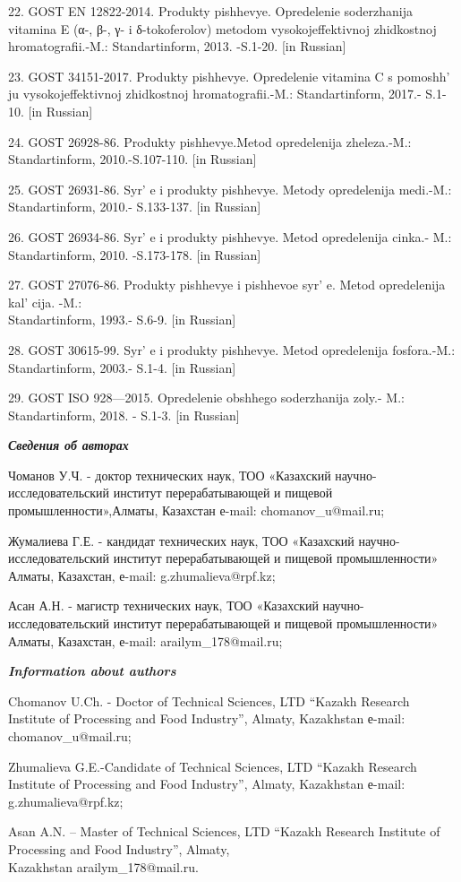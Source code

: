 \begin{references}
22. GOST EN 12822-2014. Produkty pishhevye. Opredelenie soderzhanija
vitamina E (α-, β-, γ- i δ-tokoferolov) metodom vysokojeffektivnoj
zhidkostnoj hromatografii.-M.: Standartinform, 2013. -S.1-20. {[}in
Russian{]}

23. GOST 34151-2017. Produkty pishhevye. Opredelenie vitamina C s
pomoshh' ju vysokojeffektivnoj zhidkostnoj
hromatografii.-M.: Standartinform, 2017.- S.1-10. {[}in Russian{]}

24. GOST 26928-86. Produkty pishhevye.Metod opredelenija zheleza.-M.:
Standartinform, 2010.-S.107-110. {[}in Russian{]}

25. GOST 26931-86. Syr' e i produkty pishhevye. Metody
opredelenija medi.-M.: Standartinform, 2010.- S.133-137. {[}in
Russian{]}

26. GOST 26934-86. Syr' e i produkty pishhevye. Metod
opredelenija cinka.- M.: Standartinform, 2010. -S.173-178. {[}in
Russian{]}

27. GOST 27076-86. Produkty pishhevye i pishhevoe syr' e.
Metod opredelenija kal' cija. -M.: \\Standartinform, 1993.-
S.6-9. {[}in Russian{]}

28. GOST 30615-99. Syr' e i produkty pishhevye. Metod
opredelenija fosfora.-M.: Standartinform, 2003.- S.1-4. {[}in
Russian{]}

29. GOST ISO 928---2015. Opredelenie obshhego soderzhanija zoly.- M.:
Standartinform, 2018. - S.1-3. {[}in Russian{]}
\end{references}

\begin{authorinfo}
\emph{{\bfseries Сведения об авторах}}

Чоманов У.Ч. - доктор технических наук, ТОО «Казахский
научно-исследовательский институт перерабатывающей и пищевой
промышленности»,Алматы, Казахстан е-mail:
chomanov\_u@mail.ru;

Жумалиева Г.Е. - кандидат технических наук, ТОО «Казахский
научно-исследовательский институт перерабатывающей и пищевой
промышленности» Алматы, Казахстан, е-mail:
g.zhumalieva@rpf.kz;

Асан А.Н. - магистр технических наук, ТОО «Казахский
научно-исследовательский институт перерабатывающей и пищевой
промышленности» Алматы, Казахстан, е-mail:
arailym\_178@mail.ru;

\emph{{\bfseries Information about authors}}

Chomanov U.Ch. - Doctor of Technical Sciences, LTD ``Kazakh Research
Institute of Processing and Food Industry'', Almaty, Kazakhstan е-mail:
chomanov\_u@mail.ru;

Zhumalieva G.E.-Candidate of Technical Sciences, LTD ``Kazakh Research
Institute of Processing and Food Industry'', Almaty, Kazakhstan е-mail:
g.zhumalieva@rpf.kz;

Asan A.N. -- Master of Technical Sciences, LTD ``Kazakh Research
Institute of Processing and Food Industry'', Almaty, \\Kazakhstan
arailym\_178@mail.ru.
\end{authorinfo}

